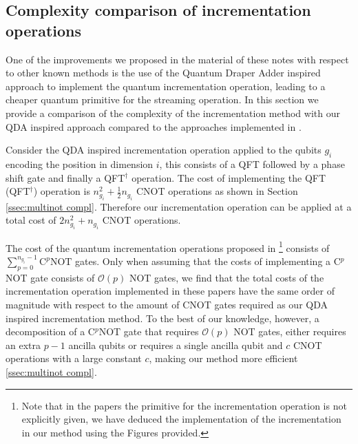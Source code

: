 \subsection{Complexity comparison of incrementation operations}\label{ssec:complexity incrementation}
One of the improvements we proposed in the material of these notes with respect to other known methods \cite{Todorova2020, Budinski2020, Budinski2021} is the use of the Quantum Draper Adder \cite{Draper1998} inspired approach to implement the quantum incrementation operation, leading to a cheaper quantum primitive for the streaming operation. In this section we provide a comparison of the complexity of the incrementation method with our QDA inspired approach compared to the approaches implemented in \cite{Todorova2020, Budinski2020, Budinski2021}. 

Consider the QDA inspired incrementation operation applied to the qubits $g_i$ encoding the position in dimension $i$, this consists of a QFT followed by a phase shift gate and finally a QFT$^\dagger$ operation. 
The cost of implementing the QFT (QFT$^\dagger$) operation is $n_{g_i}^2 + \frac{1}{2}n_{g_i}$ CNOT operations as shown in Section \ref{ssec:multinot compl}. Therefore our incrementation operation can be applied at a total cost of $2 n_{g_i}^2 + n_{g_i}$ CNOT operations. 

The cost of the quantum incrementation operations proposed in \cite{Todorova2020, Budinski2020, Budinski2021}\footnote{Note that in the papers \cite{Budinski2020, Budinski2021} the primitive for the incrementation operation is not explicitly given, we have deduced the implementation of the incrementation in our method using the Figures provided.} consists of $\sum_{p=0}^{n_{g_i}-1} \text{C}^p\text{NOT}  $ gates. Only when assuming that the costs of implementing a C$^p$NOT gate consists of $\mathcal{O}\left ( p\right )$ NOT gates, we find that the total costs of the incrementation operation implemented in these papers have the same order of magnitude with respect to the amount of CNOT gates required as our QDA inspired incrementation method. To the best of our knowledge, however, a decomposition of a C$^p$NOT gate that requires $\mathcal{O}\left ( p\right )$ NOT gates, either requires an extra $p-1$ ancilla qubits or requires a single ancilla qubit and $c$ CNOT operations with a large constant $c$, making our method more efficient \ref{ssec:multinot compl}. 
